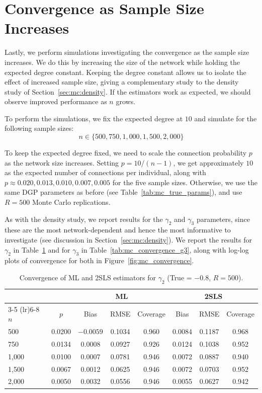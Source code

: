 \section{Convergence as Sample Size Increases}
\label{sec:mc:convergence}
Lastly, we perform simulations investigating the convergence as the sample size increases. We do this by increasing the size of the network while holding the expected degree constant. Keeping the degree constant allows us to isolate the effect of increased sample size, giving a complementary study to the density study of Section~\ref{sec:mc:density}. If the estimators work as expected, we should observe improved performance as $n$ grows.

To perform the simulations, we fix the expected degree at $10$ and simulate for the following sample sizes:
\begin{equation}
    n \in \{500, 750, 1{,}000, 1{,}500, 2{,}000\}
\end{equation}

To keep the expected degree fixed, we need to scale the connection probability $p$ as the network size increases. Setting $p = 10/(n-1)$, we get approximately $10$ as the expected number of connections per individual, along with $p \approx 0.020, 0.013, 0.010, 0.007, 0.005$ for the five sample sizes. Otherwise, we use the same DGP parameters as before (see Table~\ref{tab:mc_true_params}), and use $R = 500$ Monte Carlo replications.

As with the density study, we report results for the $\gamma_2$ and $\gamma_3$ parameters, since these are the most network-dependent and hence the most informative to investigate (see discussion in Section~\ref{sec:mc:density}). We report the results for $\gamma_2$ in Table~\ref{tab:mc_convergence_g2} and for $\gamma_3$ in Table~\ref{tab:mc_convergence_g3}, along with log-log plots of convergence for both in Figure~\ref{fig:mc_convergence}.

\begin{table}[htbp]
\centering
\caption[Convergence of ML and 2SLS estimators for $\gamma_2$]{Convergence of ML and 2SLS estimators for $\gamma_2$ (True = $-0.8$, $R = 500$).}
\label{tab:mc_convergence_g2}
\begin{tabular}{lccccccc}
\toprule
 & & \multicolumn{3}{c}{ML} & \multicolumn{3}{c}{2SLS} \\
\cmidrule(lr){3-5} \cmidrule(lr){6-8}
$n$ & $p$ & Bias & RMSE & Coverage & Bias & RMSE & Coverage \\
\midrule
500 & 0.0200 & $-0.0059$ & 0.1034 & 0.960 & 0.0084 & 0.1187 & 0.968 \\
750 & 0.0134 & 0.0008 & 0.0927 & 0.926 & 0.0124 & 0.1038 & 0.952 \\
1{,}000 & 0.0100 & 0.0007 & 0.0781 & 0.946 & 0.0072 & 0.0887 & 0.940 \\
1{,}500 & 0.0067 & 0.0012 & 0.0625 & 0.946 & 0.0072 & 0.0703 & 0.952 \\
2{,}000 & 0.0050 & 0.0032 & 0.0556 & 0.946 & 0.0055 & 0.0627 & 0.942 \\
\bottomrule
\end{tabular}
\end{table}

